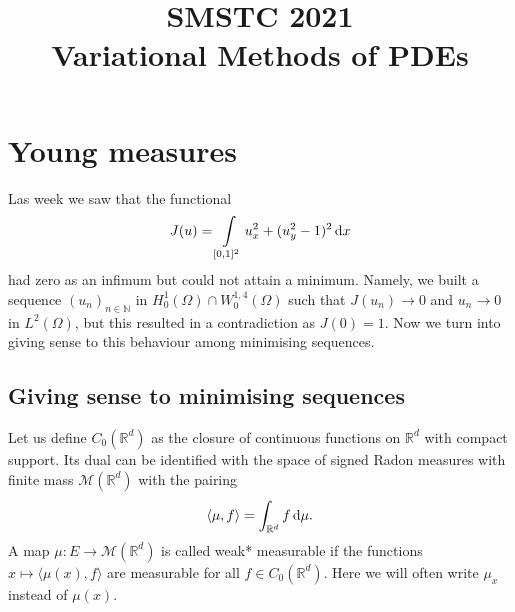 \documentclass[a4paper,doc,11pt]{article}
\title{\bf
    \Large
    SMSTC 2021 
    \\
    Variational Methods of PDEs
}
\author{}%
\date{}
\newcommand{\R}{\mathbb{R}}
\newcommand{\N}{\mathbb{N}}
\begin{document}
\maketitle






\setcounter{section}{5}
\section{Young measures}


Las week we saw that the functional 
\[
    J(u) = \int\limits_{[0,1]^2} u_x^2 + (u_y^2-1)^2 \dif x
\]
had zero as an infimum but could not attain a minimum. Namely, we built a sequence \((u_n)_{n\in \N}\) in \(H_0^1 (\Omega) \cap W_0^{1,4} (\Omega)\) such that \( J(u_n) \to 0\) and \(u_n \to 0\) in \(L^2(\Omega)\), but this resulted in a contradiction as \(J(0) = 1\). Now we turn into giving sense to this behaviour among minimising sequences.

\subsection{Giving sense to minimising sequences}

Let us define \(C_0(\R^d)\) as the closure of continuous functions on \(\R^d\) with compact support. Its dual can be identified with the space of signed Radon measures with finite mass \(\mathcal{M}(\R^d)\) with the pairing
\[
    \langle \mu,f \rangle = \int_{\R^d} f \dif \mu.
\]
A map \(\mu : E \to \mathcal{M}(\R^d)\) is called weak* measurable if the functions \(x \mapsto \langle \mu(x), f\rangle\) are measurable for all \(f\in C_0 (\R^d)\). Here we will often write \(\mu_x\) instead of \(\mu(x)\).
\end{document}

